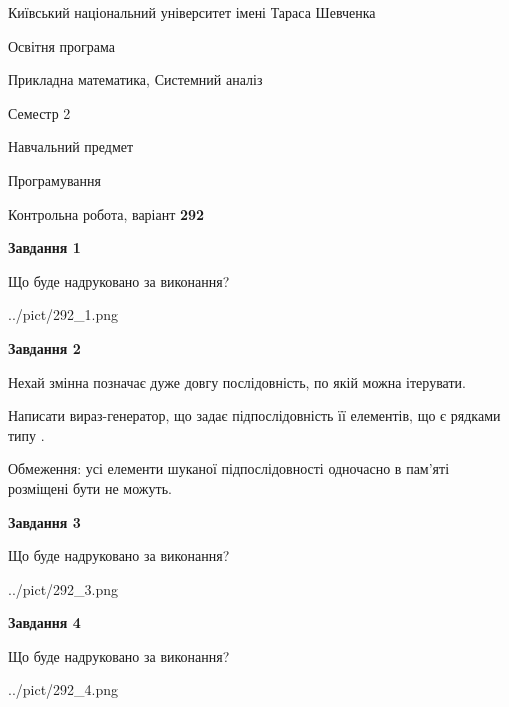 \documentclass[12pt, ukrainian]{article}
\begin{document}
{{\begin {small}\par
{ \center  Київський національний університет імені Тараса Шевченка \par}
{\parbox {5 cm}{Освітня програма \hfill}{\parbox {8 cm}{Прикладна математика, Системний аналіз \hfill}}\parbox {5 cm}{\hfill Семестр 2}}\par
{\parbox {5 cm} {Навчальний предмет \hfill}\parbox {7 cm}{Програмування \hfill}\parbox {6cm}{\hfill}\par}\vspace{-7pt} \end{small}}{\center Контрольна робота, варіант  \No \textbf
{ 292 }\par}}
{
\begin {large}
{\begin {center}\textbf{Завдання 1}\end {center}}\par
Що буде надруковано за виконання?\par\par
\begin{center}
	{../pict/292_1.png}
\end{center}
\newpage

{\begin {center}\textbf{Завдання 2}\end {center}}\par
Нехай змінна  позначає дуже довгу послідовність, по якій можна ітерувати.

Написати вираз-генератор, що задає підпослідовність її елементів, що є рядками типу .

Обмеження: усі елементи шуканої підпослідовності одночасно в пам'яті розміщені бути не можуть.\par
\newpage

{\begin {center}\textbf{Завдання 3}\end {center}}\par
Що буде надруковано за виконання?\par
\begin{center}
	{../pict/292_3.png}
\end{center}
\newpage

{\begin {center}\textbf{Завдання 4}\end {center}}\par
Що буде надруковано за виконання?\par
\begin{center}
	{../pict/292_4.png}
\end{center}
\newpage


\end{large}}
\end{document}
